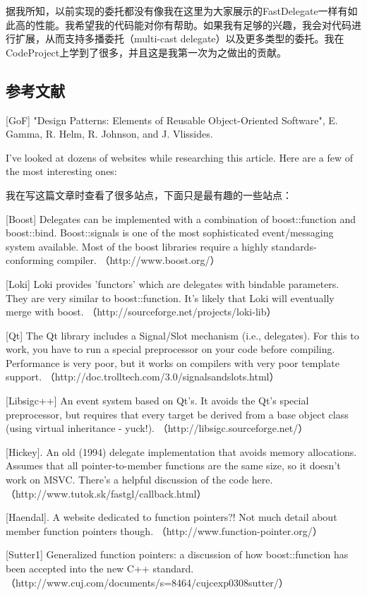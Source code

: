 \documentclass{article}
\begin{document}
\begin{CJK}{UTF8}{gbsn}
据我所知，以前实现的委托都没有像我在这里为大家展示的FastDelegate一样有如此高的性能。我希望我的代码能对你有帮助。如果我有足够的兴趣，我会对代码进行扩展，从而支持多播委托（multi-cast delegate）以及更多类型的委托。我在CodeProject上学到了很多，并且这是我第一次为之做出的贡献。

\subsection{参考文献}
[GoF] "Design Patterns: Elements of Reusable Object-Oriented Software", E. Gamma, R. Helm, R. Johnson, and J. Vlissides. 

I've looked at dozens of websites while researching this article. Here are a few of the most interesting ones:

我在写这篇文章时查看了很多站点，下面只是最有趣的一些站点：

[Boost] Delegates can be implemented with a combination of boost::function and boost::bind. Boost::signals is one of the most sophisticated event/messaging system available. Most of the boost libraries require a highly standards-conforming compiler. （http://www.boost.org/）

[Loki] Loki provides 'functors' which are delegates with bindable parameters. They are very similar to boost::function. It's likely that Loki will eventually merge with boost. （http://sourceforge.net/projects/loki-lib）

[Qt] The Qt library includes a Signal/Slot mechanism (i.e., delegates). For this to work, you have to run a special preprocessor on your code before compiling. Performance is very poor, but it works on compilers with very poor template support. （http://doc.trolltech.com/3.0/signalsandslots.html）

[Libsigc++] An event system based on Qt's. It avoids the Qt's special preprocessor, but requires that every target be derived from a base object class (using virtual inheritance - yuck!). （http://libsigc.sourceforge.net/）

[Hickey]. An old (1994) delegate implementation that avoids memory allocations. Assumes that all pointer-to-member functions are the same size, so it doesn't work on MSVC. There's a helpful discussion of the code here. （http://www.tutok.sk/fastgl/callback.html）

[Haendal]. A website dedicated to function pointers?! Not much detail about member function pointers though. （http://www.function-pointer.org/）

[Sutter1] Generalized function pointers: a discussion of how boost::function has been accepted into the new C++ standard. （http://www.cuj.com/documents/s=8464/cujcexp0308sutter/）


\end{CJK}
\end{document}
